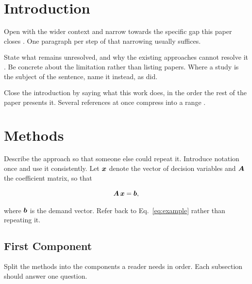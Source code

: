 \documentclass[12pt,a4paper]{article}
\begin{document}
\newpage

\tableofcontents
\newpage


\section{Introduction}

Open with the wider context and narrow towards the specific gap this paper
closes \cite{firstReference2024, secondReference2023}. One paragraph per step of
that narrowing usually suffices.

State what remains unresolved, and why the existing approaches cannot resolve it
\cite{thirdReference2022}. Be concrete about the limitation rather than listing
papers. Where a study is the subject of the sentence, name it instead, as
\citet{secondReference2023} did.

Close the introduction by saying what this work does, in the order the rest of
the paper presents it. Several references at once compress into a range
\cite{firstReference2024, secondReference2023, thirdReference2022}.


\section{Methods} \label{sec:methods}

Describe the approach so that someone else could repeat it. Introduce notation
once and use it consistently. Let $\vectorsym{x}$ denote the vector of decision
variables and $\matrixsym{A}$ the coefficient matrix, so that

\begin{equation} \label{eq:example}
    \matrixsym{A} \, \vectorsym{x} = \vectorsym{b},
\end{equation}

where $\vectorsym{b}$ is the demand vector. Refer back to
Eq.~\ref{eq:example} rather than repeating it.

\subsection{First Component} \label{sec:first_component}

Split the methods into the components a reader needs in order. Each subsection
should answer one question.
\end{document}
